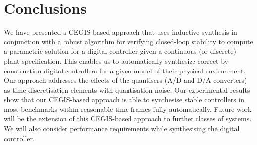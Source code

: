 \documentclass{sig-alternate-05-2015}
\begin{document}

\section{Conclusions}

We have presented a CEGIS-based approach that uses inductive synthesis in
conjunction with a robust algorithm for verifying closed-loop stability to
compute a parametric solution for a digital controller given a continuous
(or discrete) plant specification.  This enables us to automatically
synthesize correct-by-construction digital controllers for a given model of
their physical environment.  Our approach addresses the effects of the
quantisers (A/D and D/A converters) as time discretisation elements with
quantisation noise.  Our experimental results show that our CEGIS-based
approach is able to synthesise stable controllers in most benchmarks within
reasonable time frames fully automatically.
%
%
Future work will be the extension of this CEGIS-based approach to further
classes of systems.  We will also consider performance requirements while
synthesising the digital controller.


  

\end{document}

